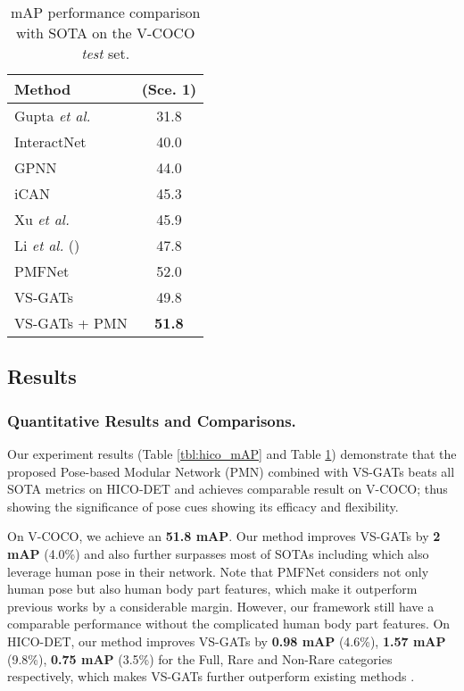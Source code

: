 \documentclass[10pt,twocolumn,letterpaper]{article}
\begin{document}
\begin{table}[h]
\centering
    \begin{tabular}{lc}
\toprule
    Method                                                  &  (Sce. 1)  \\
    \midrule
    Gupta \textit{et al.} \cite{DBLP:GuptaM15}              & 31.8 \\
    InteractNet \cite{gkioxari2018detecting}                & 40.0 \\
    GPNN \cite{qi2018learning}                              & 44.0 \\
    iCAN \cite{gao2018ican}                                 & 45.3 \\
    Xu \textit{et al.} \cite{xu2019learning}                & 45.9 \\
    Li \textit{et al.} () \cite{Li_2019_CVPR}      & 47.8 \\
    PMFNet \cite{wan2019pose}                               & 52.0 \\
    \midrule
    VS-GATs  \cite{liang2020visualsemantic}                 & 49.8  \\
    VS-GATs + PMN                                          & \textbf{51.8}  \\ 
    \bottomrule
    \end{tabular}
    \caption{mAP performance comparison with SOTA on the V-COCO \textit{test} set.}
    \label{tbl:vcoco}
\end{table}
\subsection{Results}\label{subsec:result}
\subsubsection{Quantitative Results and Comparisons.} \label{subsubSec:quantiative_result}
Our experiment results (Table \ref{tbl:hico_mAP} and Table \ref{tbl:vcoco}) demonstrate that the proposed Pose-based Modular Network (PMN) combined with VS-GATs \cite{liang2020visualsemantic} beats all SOTA metrics on HICO-DET and achieves comparable result on V-COCO; thus showing the significance of pose cues showing its efficacy and flexibility.

On V-COCO, we achieve an \textbf{51.8 mAP}. Our method improves VS-GATs by \textbf{2 mAP} (4.0\%) and also further surpasses most of SOTAs including \cite{Li_2019_CVPR} which also leverage human pose in their network. Note that PMFNet \cite{wan2019pose} considers not only human pose but also human body part features, which make it outperform previous works by a considerable margin. However, our framework still have a comparable performance without the complicated human body part features.
On HICO-DET, our method improves VS-GATs by \textbf{0.98 mAP} (4.6\%), \textbf{1.57 mAP} (9.8\%), \textbf{0.75 mAP} (3.5\%) for the Full, Rare and Non-Rare categories respectively, which makes VS-GATs \cite{liang2020visualsemantic} further outperform existing methods \cite{chao2018learning,gkioxari2018detecting,qi2018learning,gao2018ican,xu2019learning,gupta2018nofrills,Li_2019_CVPR,wan2019pose,2019PeyreDetecting}. 
\end{document}
